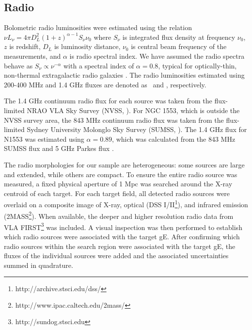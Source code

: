 \documentclass{emulateapj}
\begin{document}
\subsection{Radio}
\label{sec:radio}

Bolometric radio luminosities were estimated using the relation $\nu
L_{\nu} = 4 \pi D_L^2 (1+z)^{\alpha-1} S_{\nu} \nu_0$ where $S_{\nu}$
is integrated flux density at frequency $\nu_0$, $z$ is redshift,
$D_L$ is luminosity distance, $\nu_0$ is central beam frequency of the
measurements, and $\alpha$ is radio spectral index. We have assumed
the radio spectra behave as $S_{\nu} \propto \nu^{-\alpha}$ with a
spectral index of $\alpha = 0.8$, typical for optically-thin,
non-thermal extragalactic radio galaxies
\citep{1992ARA&A..30..575C}. The radio luminosities estimated using
200-400 MHz and 1.4 GHz fluxes are denoted as \plow\ and \phigh,
respectively.

The 1.4 GHz continuum radio flux for each source was taken from the
flux-limited NRAO VLA Sky Survey (NVSS, \citealt{nvss}). For NGC 1553,
which is outside the NVSS survey area, the 843 MHz continuum radio
flux was taken from the flux-limited Sydney University Molonglo Sky
Survey (SUMSS, \citealt{sumss1, sumss2}). The 1.4 GHz flux for N1553
was estimated using $\alpha = 0.89$, which was calculated from the 843
MHz SUMSS flux and 5 GHz Parkes flux \citep{1970ApL.....5...29W}.

The radio morphologies for our sample are heterogeneous: some sources
are large and extended, while others are compact. To ensure the entire
radio source was measured, a fixed physical aperture of 1 Mpc was
searched around the X-ray centroid of each target. For each target
field, all detected radio sources were overlaid on a composite image
of X-ray, optical (DSS I/II\footnote{http://archive.stsci.edu/dss/}),
and infrared emission
(2MASS\footnote{http://www.ipac.caltech.edu/2mass/}). When available,
the deeper and higher resolution radio data from VLA
FIRST\footnote{http://sundog.stsci.edu} was included. A visual
inspection was then performed to establish which radio sources were
associated with the target gE. After confirming which radio sources
within the search region were associated with the target gE, the
fluxes of the individual sources were added and the associated
uncertainties summed in quadrature.
\end{document}
